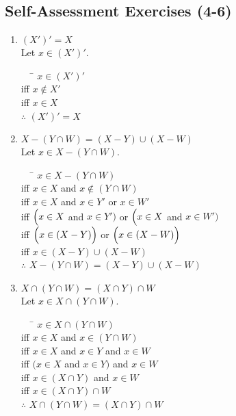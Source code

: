 \documentclass[../notes.tex]{subfiles}
\begin{document}
			\subsection{Self-Assessment Exercises (4-6)}
				\begin{enumerate}[label=(\alph*)]
					\item $(X')' = X$\\
						Let $x \in (X')'$.
						\begin{tabbing}
							$\quad$ \= $x \in (X')'$\\
							iff \> $x \notin X'$\\
							iff \> $x \in X$\\
							$\therefore$ \> $(X')' = X$
						\end{tabbing}
					\item $X - (Y \cap W) = (X - Y) \cup (X - W)$\\
						Let $x \in X - (Y \cap W)$.
						\begin{tabbing}
							$\quad$ \= $x \in X - (Y \cap W)$\\
							iff \> $x \in X$ and $x \notin (Y \cap W)$\\
							iff \> $x \in X$ and $x \in Y'$ or $x \in W'$\\
							iff \> $\Bigl(x \in X$ and $x \in Y'\Bigr)$ or $\Bigl(x \in X$ and $x \in W'\Bigr)$\\
							iff \> $\Bigl(x \in (X - Y)\Bigr)$ or $\Bigl(x \in (X - W)\Bigr)$\\
							iff \> $x \in (X - Y) \cup (X - W)$\\
							$\therefore$ \> $X - (Y \cap W) = (X - Y) \cup (X - W)$
						\end{tabbing}
					\item $X \cap (Y \cap W) = (X \cap Y) \cap W$\\
						Let $x \in X \cap (Y \cap W)$.
						\begin{tabbing}
							$\quad$ \= $x \in X \cap (Y \cap W)$\\
							iff \> $x \in X$ and $x \in (Y \cap W)$\\
							iff \> $x \in X$ and $x \in Y$ and $x \in W$\\
							iff \> $(x \in X$ and $x \in Y)$ and $x \in W$\\
							iff \> $x \in (X \cap Y)$ and $x \in W$\\
							iff \> $x \in (X \cap Y) \cap W$\\
							$\therefore$ \> $X \cap (Y \cap W) = (X \cap Y) \cap W$
						\end{tabbing}

\end{enumerate}
\end{document}
